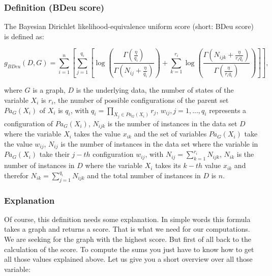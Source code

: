 			\subsubsection{Definition (BDeu score)}

				The Bayesian Dirichlet likelihood-equivalence uniform score (short: BDeu score) is defined as:

				\begin{equation}
					g_{BDeu}(D, G) = \sum_{i = 1}^{n} \left[ \sum_{j = 1}^{q_{i}} \left[ \log\left( \frac{\Gamma (\frac{\eta}{q_{i}})}{\Gamma (N_{ij} + \frac{\eta}{q_{i}})} \right) + \sum_{k = 1}^{r_{i}} \log \left( \frac{\Gamma (N_{ijk} + \frac{\eta}{r_{i} q_{i}})}{\Gamma (\frac{\eta}{r_{i} q_{i}})} \right) \right] \right],
				\end{equation}

				where $G$ is a graph, $D$ is the underlying data, the number of states of the variable $X_{i}$ is $r_{i}$, the number of possible configurations of the parent set $Pa_{G}(X_{i})$ of $X_{i}$ is $q_{i}$, with $q_{i} = \prod_{X_{j} \in Pa_{G}(X_{i})} r_{j}$, $w_{ij}, j = 1,...,q_{i}$ represents a configuration of $Pa_{G}(X_{i})$, $N_{ijk}$ is the number of instances in the data set $D$ where the variable $X_{i}$ takes the value $x_{ik}$ and the set of variables $Pa_{G}(X_{i})$ take the value $w_{ij}$, $N_{ij}$ is the number of instances in the data set where the variable in $Pa_{G}(X_{i})$ take their $j-th$ configuration $w_{ij}$, with $N_{ij} = \sum_{k = 1}^{r_{i}} N_{ijk}$, $N_{ik}$ is the number of instances in $D$ where the variable $X_{i}$ takes its $k-th$ value $x_{ik}$ and therefor $N_{ik} = \sum_{j = 1}^{q_{i}} N_{ijk}$ and the total number of instances in $D$ is $n$.

			\subsubsection{Explanation}

				Of course, this definition needs some explanation. In simple words this formula takes a graph and returns a score. That is what we need for our computations. We are seeking for the graph with the highest score. But first of all back to the calculation of the score. To compute the sums you just have to know how to get all those values explained above. Let us give you a short overview over all those variable:

